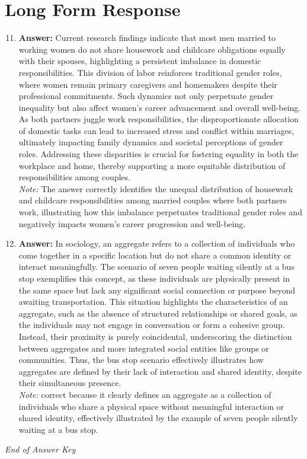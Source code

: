 \documentclass[12pt]{article}
\begin{document}
\section*{Long Form Response}
\begin{enumerate}[label=\arabic*.]
\setcounter{enumi}{10}
\item \textbf{Answer:} Current research findings indicate that most men married to working women do not share housework and childcare obligations equally with their spouses, highlighting a persistent imbalance in domestic responsibilities. This division of labor reinforces traditional gender roles, where women remain primary caregivers and homemakers despite their professional commitments. Such dynamics not only perpetuate gender inequality but also affect women's career advancement and overall well-being. As both partners juggle work responsibilities, the disproportionate allocation of domestic tasks can lead to increased stress and conflict within marriages, ultimately impacting family dynamics and societal perceptions of gender roles. Addressing these disparities is crucial for fostering equality in both the workplace and home, thereby supporting a more equitable distribution of responsibilities among couples.
\\ \textit{Note:} The answer correctly identifies the unequal distribution of housework and childcare responsibilities among married couples where both partners work, illustrating how this imbalance perpetuates traditional gender roles and negatively impacts women's career progression and well-being.
\item \textbf{Answer:} In sociology, an aggregate refers to a collection of individuals who come together in a specific location but do not share a common identity or interact meaningfully. The scenario of seven people waiting silently at a bus stop exemplifies this concept, as these individuals are physically present in the same space but lack any significant social connection or purpose beyond awaiting transportation. This situation highlights the characteristics of an aggregate, such as the absence of structured relationships or shared goals, as the individuals may not engage in conversation or form a cohesive group. Instead, their proximity is purely coincidental, underscoring the distinction between aggregates and more integrated social entities like groups or communities. Thus, the bus stop scenario effectively illustrates how aggregates are defined by their lack of interaction and shared identity, despite their simultaneous presence.
\\ \textit{Note:} correct because it clearly defines an aggregate as a collection of individuals who share a physical space without meaningful interaction or shared identity, effectively illustrated by the example of seven people silently waiting at a bus stop.
\end{enumerate}

\vfill
\noindent\textit{End of Answer Key}
\end{document}
